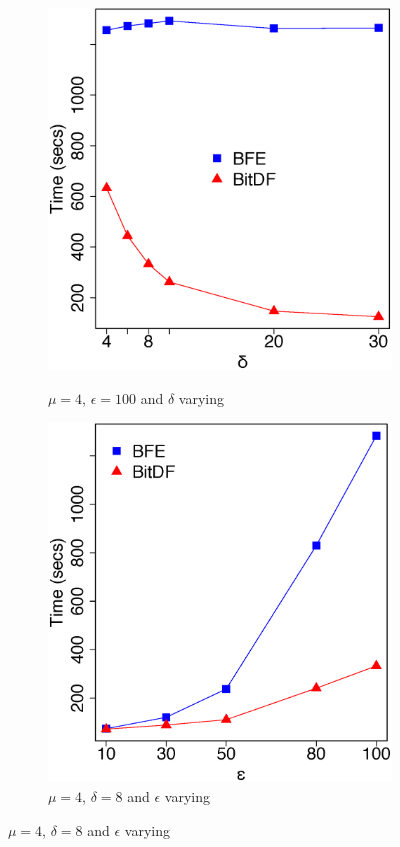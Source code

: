 {\begin{figure}[h!]
    \centering
    \caption{Results varying $\delta$ and $\epsilon$ for TDrive dataset}
    \begin{subfigure}[t]{0.48\textwidth}
        \caption{$\mu = 4$, $\epsilon = 100$ and $\delta$ varying}
        \includegraphics[width=\textwidth]{images/TDrive_n_4_g_100_varying_l.eps}
        \label{fig:tdrive_vary_l}
    \end{subfigure}
    \begin{subfigure}[t]{0.48\textwidth}
        \caption{$\mu = 4$, $\delta = 8$ and $\epsilon$ varying}
        \includegraphics[width=\textwidth]{images/TDrive_n_4_l_8_varying_g.eps}

\end{subfigure}
\end{figure}}
